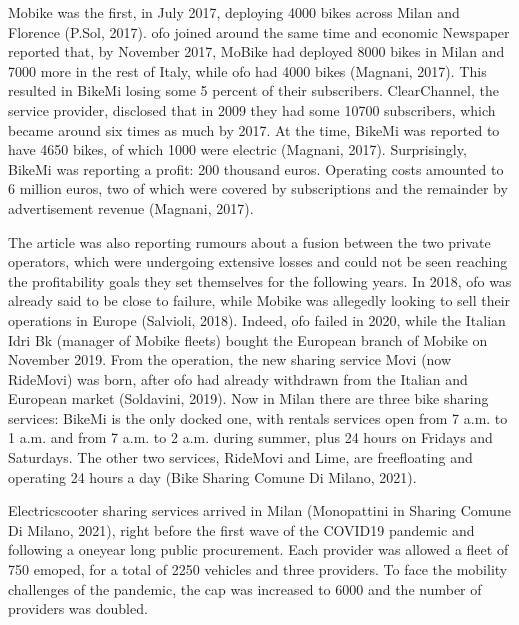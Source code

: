 \documentclass[letterpaper,10pt,english]{jupyterBook}
\begin{document}
\sphinxAtStartPar
Mobike was the first, in July 2017, deploying 4000 bikes across Milan and Florence (P.Sol, 2017). ofo joined around the same time and economic Newspaper  reported that, by November 2017, MoBike had deployed 8000 bikes in Milan and 7000 more in the rest of Italy, while ofo had 4000 bikes (Magnani, 2017). This resulted in BikeMi losing some 5 percent of their subscribers. ClearChannel, the service provider, disclosed that in 2009 they had some 10700 subscribers, which became around six times as much by 2017. At the time, BikeMi was reported to have 4650 bikes, of which 1000 were electric (Magnani, 2017). Surprisingly, BikeMi was reporting a profit: 200 thousand euros. Operating costs amounted to 6 million euros, two of which were covered by subscriptions and the remainder by advertisement revenue (Magnani, 2017).

\sphinxAtStartPar
The article was also reporting rumours about a fusion between the two private operators, which were undergoing extensive losses and could not be seen reaching the profitability goals they set themselves for the following years. In 2018, ofo was already said to be close to failure, while Mobike was allegedly looking to sell their operations in Europe (Salvioli, 2018). Indeed, ofo failed in 2020, while the Italian Idri Bk (manager of Mobike fleets) bought the European branch of Mobike on November 2019. From the operation, the new sharing service Movi (now RideMovi) was born, after ofo had already withdrawn from the Italian and European market (Soldavini, 2019). Now in Milan there are three bike sharing services: BikeMi is the only docked one, with rentals services open from 7 a.m. to 1 a.m. and from 7 a.m. to 2 a.m. during summer, plus 24 hours on Fridays and Saturdays. The other two services, RideMovi and Lime, are free\sphinxhyphen{}floating and operating 24 hours a day (Bike Sharing \sphinxhyphen{} Comune Di Milano, 2021).

\sphinxAtStartPar
Electric\sphinxhyphen{}scooter sharing services arrived in Milan  (Monopattini in Sharing \sphinxhyphen{} Comune Di Milano, 2021), right before the first wave of the COVID\sphinxhyphen{}19 pandemic and following a one\sphinxhyphen{}year long public procurement. Each provider was allowed a fleet of 750 e\sphinxhyphen{}moped, for a total of 2250 vehicles and three providers. To face the mobility challenges of the pandemic, the cap was increased to 6000 and the number of providers was doubled.
\end{document}
